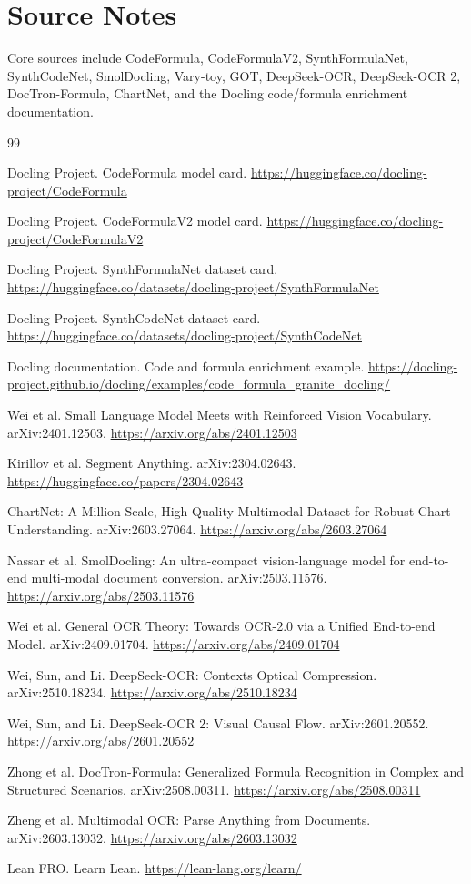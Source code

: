 \documentclass[11pt]{article}
\begin{document}
\section{Source Notes}

Core sources include CodeFormula, CodeFormulaV2, SynthFormulaNet, SynthCodeNet, SmolDocling, Vary-toy, GOT, DeepSeek-OCR, DeepSeek-OCR 2, DocTron-Formula, ChartNet, and the Docling code/formula enrichment documentation.

\begin{thebibliography}{99}

Docling Project. CodeFormula model card. \url{https://huggingface.co/docling-project/CodeFormula}

Docling Project. CodeFormulaV2 model card. \url{https://huggingface.co/docling-project/CodeFormulaV2}

Docling Project. SynthFormulaNet dataset card. \url{https://huggingface.co/datasets/docling-project/SynthFormulaNet}

Docling Project. SynthCodeNet dataset card. \url{https://huggingface.co/datasets/docling-project/SynthCodeNet}

Docling documentation. Code and formula enrichment example. \url{https://docling-project.github.io/docling/examples/code_formula_granite_docling/}

Wei et al. Small Language Model Meets with Reinforced Vision Vocabulary. arXiv:2401.12503. \url{https://arxiv.org/abs/2401.12503}

Kirillov et al. Segment Anything. arXiv:2304.02643. \url{https://huggingface.co/papers/2304.02643}

ChartNet: A Million-Scale, High-Quality Multimodal Dataset for Robust Chart Understanding. arXiv:2603.27064. \url{https://arxiv.org/abs/2603.27064}

Nassar et al. SmolDocling: An ultra-compact vision-language model for end-to-end multi-modal document conversion. arXiv:2503.11576. \url{https://arxiv.org/abs/2503.11576}

Wei et al. General OCR Theory: Towards OCR-2.0 via a Unified End-to-end Model. arXiv:2409.01704. \url{https://arxiv.org/abs/2409.01704}

Wei, Sun, and Li. DeepSeek-OCR: Contexts Optical Compression. arXiv:2510.18234. \url{https://arxiv.org/abs/2510.18234}

Wei, Sun, and Li. DeepSeek-OCR 2: Visual Causal Flow. arXiv:2601.20552. \url{https://arxiv.org/abs/2601.20552}

Zhong et al. DocTron-Formula: Generalized Formula Recognition in Complex and Structured Scenarios. arXiv:2508.00311. \url{https://arxiv.org/abs/2508.00311}

Zheng et al. Multimodal OCR: Parse Anything from Documents. arXiv:2603.13032. \url{https://arxiv.org/abs/2603.13032}

Lean FRO. Learn Lean. \url{https://lean-lang.org/learn/}

\end{thebibliography}
\end{document}
